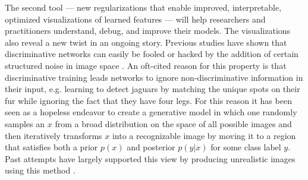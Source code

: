 \documentclass{article}
\begin{document}
The second tool --- new regularizations that enable improved, interpretable, optimized visualizations of learned features --- will help researchers and practitioners understand, debug, and improve their models. The visualizations also reveal a new twist in an ongoing story. Previous studies
have shown that discriminative networks can easily be fooled or hacked by the addition of certain structured
noise in image space \cite{szegedy2013intriguing-properties-of-neural,nguyen-2014-arXiv-deep-neural-networks}.
An oft-cited reason for this property is that discriminative training leads networks
to ignore non-discriminative information in their input, e.g. learning to detect jaguars by matching the unique spots on their fur while ignoring the fact that they have four legs. For this reason it has been seen as a hopeless endeavor to create a generative model in which one randomly samples an $x$ from a broad distribution on the space of all possible images
and then iteratively transforms $x$ into a recognizable image by moving it to a region that satisfies both a prior $p(x)$ and posterior $p(y|x)$ for some class label $y$.
Past attempts have largely supported this view by producing unrealistic images using this method \cite{nguyen-2014-arXiv-deep-neural-networks,simonyan2013deep-inside-convolutional}.
\end{document}
